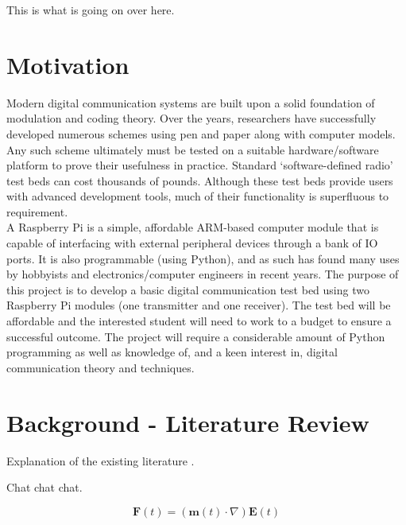 \documentclass[../main.tex]{subfiles}
\begin{document}
This is what is going on over here.


\section{Motivation}
Modern digital communication systems are built upon a solid foundation of modulation and coding theory.
Over the years, researchers have successfully developed numerous schemes using pen and paper along with computer models.
Any such scheme ultimately must be tested on a suitable hardware/software platform to prove their usefulness in practice.
Standard ‘software-defined radio’ test beds can cost thousands of pounds.
Although these test beds provide users with advanced development tools, much of their functionality is superfluous to requirement.\\

A Raspberry Pi is a simple, affordable ARM-based computer module that is capable of interfacing with external peripheral devices through a bank of IO ports.
It is also programmable (using Python), and as such has found many uses by hobbyists and electronics/computer engineers in recent years.
The purpose of this project is to develop a basic digital communication test bed using two Raspberry Pi modules (one transmitter and one receiver).
The test bed will be affordable and the interested student will need to work to a budget to ensure a successful outcome.
The project will require a considerable amount of Python programming as well as knowledge of, and a keen interest in, digital communication theory and techniques.


\section{Background - Literature Review} \label{sec_Lit Review}
Explanation of the existing literature \cite{DhirNIPS2017}.



Chat chat chat.

\begin{equation} \label{bla}
\textbf{F}(t) = (\textbf{m}(t)\cdot\nabla)\textbf{E}(t)
\end{equation}
\end{document}
